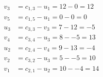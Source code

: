 \[
\begin{aligned}
v_{3} &= c_{1,3} - u_{1} = 12 - 0 = 12 \\
v_{5} &= c_{1,5} - u_{1} = 0 - 0 = 0 \\
u_{3} &= c_{3,3} - v_{3} = 7 - 12 = -5 \\
v_{4} &= c_{3,4} - u_{3} = 8 - -5 = 13 \\
u_{2} &= c_{2,4} - v_{4} = 9 - 13 = -4 \\
v_{2} &= c_{3,2} - u_{3} = 5 - -5 = 10 \\
v_{1} &= c_{2,1} - u_{2} = 10 - -4 = 14 \\
\end{aligned}
\]

